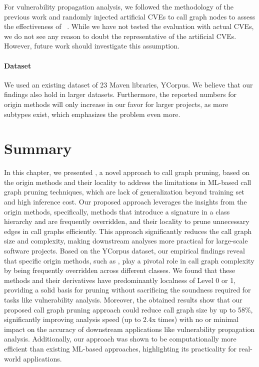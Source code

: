 For vulnerability propagation analysis, we followed the methodology of the previous work and randomly injected artificial CVEs to call graph nodes to assess the effectiveness of ~\cite{mir2024effectiveness}.
While we have not tested the evaluation with actual CVEs, we do not see any reason to doubt the representative of the artificial CVEs.
However, future work should investigate this assumption.

\paragraph{Dataset}
We used an existing dataset of 23 Maven libraries, YCorpus.
We believe that our findings also hold in larger datasets.
Furthermore, the reported numbers for origin methods will only increase in our favor for larger projects, as more subtypes exist, which emphasizes the problem even more.

\section{Summary}
In this chapter, we presented , a novel approach to call graph pruning, based on the origin methods and their locality to address the limitations in ML-based call graph pruning techniques, which are lack of generalization beyond training set and high inference cost. Our proposed approach leverages the insights from the origin methods, specifically, methods that introduce a signature in a class hierarchy and are frequently overridden, and their locality to prune unnecessary edges in call graphs efficiently. This approach significantly reduces the call graph size and complexity, making downstream analyses more practical for large-scale software projects. Based on the YCorpus dataset, our empirical findings reveal that specific origin methods, such as , play a pivotal role in call graph complexity by being frequently overridden across different classes. We found that these methods and their derivatives have predominantly localness of Level 0 or 1, providing a solid basis for pruning without sacrificing the soundness required for tasks like vulnerability analysis. Moreover, the obtained results show that our proposed call graph pruning approach could reduce call graph size by up to 58\%, significantly improving analysis speed (up to 2.4x times) with no or minimal impact on the accuracy of downstream applications like vulnerability propagation analysis. Additionally, our approach was shown to be computationally more efficient than existing ML-based approaches, highlighting its practicality for real-world applications.